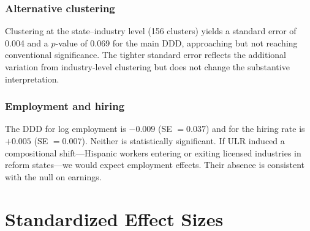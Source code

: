 \documentclass[12pt]{article}
\begin{document}
\subsubsection*{Alternative clustering} Clustering at the state--industry level (156 clusters) yields a standard error of 0.004 and a $p$-value of 0.069 for the main DDD, approaching but not reaching conventional significance. The tighter standard error reflects the additional variation from industry-level clustering but does not change the substantive interpretation.

\subsubsection*{Employment and hiring} The DDD for log employment is $-0.009$ (SE $= 0.037$) and for the hiring rate is $+0.005$ (SE $= 0.007$). Neither is statistically significant. If ULR induced a compositional shift---Hispanic workers entering or exiting licensed industries in reform states---we would expect employment effects. Their absence is consistent with the null on earnings.

\section{Standardized Effect Sizes}
\label{sec:sde}


\end{document}
